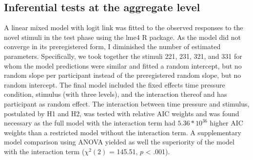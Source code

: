 \documentclass[a4paper,man,natbib]{apa6}
\begin{document}
\subsection{Inferential tests at the aggregate level}
A linear mixed model with logit link was fitted to the observed responses to the novel stimuli in the test phase using the lme4 R package. As the model did not converge in its preregistered form, I diminished the number of estimated parameters. Specifically, we took together the stimuli 221, 231, 321, and 331 for whom the model predictions were similar and fitted a random intercept, but no random slope per participant instead of the preregistered random slope, but no random intercept. The final model included the fixed effects time pressure condition, stimulus (with three levels), and the interaction thereof and has participant as random effect. The interaction between time pressure and stimulus, postulated by H1 and H2, was tested with relative AIC weights \citep[][p. 194]{wagenmakers2004aic} and was found necessary as the full model with the interaction term had $5.36 * 10^{36}$ higher AIC weights than a restricted model without the interaction term. A supplementary model comparison using ANOVA yielded as well the superiority of the model with the interaction term ($\chi^{2}(2)$ = 145.51, $p$ < .001). 
\end{document}
